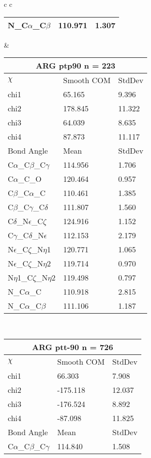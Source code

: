 \begin{longtable}{ c c }
\begin{tabular}{ l l l }
  N\_C$\alpha$\_C$\beta$ & 110.971 & 1.307\\
  \bottomrule
  \end{tabular}
  &
  \begin{tabular}{ l l l }
  \toprule
  \multicolumn{3}{c}{ARG \textbf{ptp90} n = 223} \\ \toprule
  $\chi$       & Smooth COM & StdDev \\ \midrule
  chi1 & 65.165 & 9.396 \\ 
  chi2 & 178.845 & 11.322 \\ 
  chi3 & 64.039 & 8.635 \\ 
  chi4 & 87.873 & 11.117 \\ \midrule
  Bond Angle   & Mean     & StdDev \\ \midrule
  C$\alpha$\_C$\beta$\_C$\gamma$ & 114.956 & 1.706\\
  C$\alpha$\_C\_O & 120.464 & 0.957\\
  C$\beta$\_C$\alpha$\_C & 110.461 & 1.385\\
  C$\beta$\_C$\gamma$\_C$\delta$ & 111.807 & 1.560\\
  C$\delta$\_N$\epsilon$\_C$\zeta$ & 124.916 & 1.152\\
  C$\gamma$\_C$\delta$\_N$\epsilon$ & 112.153 & 2.179\\
  N$\epsilon$\_C$\zeta$\_N$\eta$1 & 120.771 & 1.065\\
  N$\epsilon$\_C$\zeta$\_N$\eta$2 & 119.714 & 0.970\\
  N$\eta$1\_C$\zeta$\_N$\eta$2 & 119.498 & 0.797\\
  N\_C$\alpha$\_C & 110.918 & 2.815\\
  N\_C$\alpha$\_C$\beta$ & 111.106 & 1.187\\
  \bottomrule
  \end{tabular}
  \\
  \begin{tabular}{ l l l }
  \toprule
  \multicolumn{3}{c}{ARG \textbf{ptt-90} n = 726} \\ \toprule
  $\chi$       & Smooth COM & StdDev \\ \midrule
  chi1 & 66.303 & 7.908 \\ 
  chi2 & -175.118 & 12.037 \\ 
  chi3 & -176.524 & 8.892 \\ 
  chi4 & -87.098 & 11.825 \\ \midrule
  Bond Angle   & Mean     & StdDev \\ \midrule
  C$\alpha$\_C$\beta$\_C$\gamma$ & 114.840 & 1.508\\

\end{tabular}
\end{longtable}
